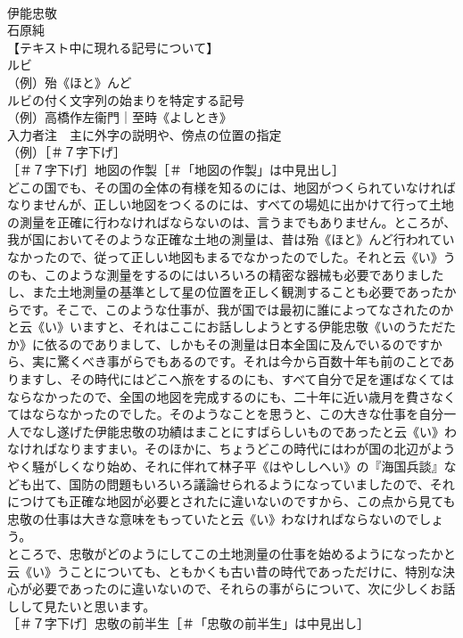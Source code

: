 \documentclass[8pt]{extreport}
\begin{document}
\begin{CJK}{UTF8}{min}
\\	伊能忠敬
\\	石原純
\\	【テキスト中に現れる記号について】
\\	ルビ
\\	（例）殆《ほと》んど
\\	ルビの付く文字列の始まりを特定する記号
\\	（例）高橋作左衞門｜至時《よしとき》
\\	入力者注　主に外字の説明や、傍点の位置の指定
\\	（例）［＃７字下げ］
\\	［＃７字下げ］地図の作製［＃「地図の作製」は中見出し］
\\	どこの国でも、その国の全体の有様を知るのには、地図がつくられていなければなりませんが、正しい地図をつくるのには、すべての場処に出かけて行って土地の測量を正確に行わなければならないのは、言うまでもありません。ところが、我が国においてそのような正確な土地の測量は、昔は殆《ほと》んど行われていなかったので、従って正しい地図もまるでなかったのでした。それと云《い》うのも、このような測量をするのにはいろいろの精密な器械も必要でありましたし、また土地測量の基準として星の位置を正しく観測することも必要であったからです。そこで、このような仕事が、我が国では最初に誰によってなされたのかと云《い》いますと、それはここにお話ししようとする伊能忠敬《いのうただたか》に依るのでありまして、しかもその測量は日本全国に及んでいるのですから、実に驚くべき事がらでもあるのです。それは今から百数十年も前のことでありますし、その時代にはどこへ旅をするのにも、すべて自分で足を運ばなくてはならなかったので、全国の地図を完成するのにも、二十年に近い歳月を費さなくてはならなかったのでした。そのようなことを思うと、この大きな仕事を自分一人でなし遂げた伊能忠敬の功績はまことにすばらしいものであったと云《い》わなければなりますまい。そのほかに、ちょうどこの時代にはわが国の北辺がようやく騒がしくなり始め、それに伴れて林子平《はやししへい》の『海国兵談』なども出て、国防の問題もいろいろ議論せられるようになっていましたので、それにつけても正確な地図が必要とされたに違いないのですから、この点から見ても忠敬の仕事は大きな意味をもっていたと云《い》わなければならないのでしょう。
\\	ところで、忠敬がどのようにしてこの土地測量の仕事を始めるようになったかと云《い》うことについても、ともかくも古い昔の時代であっただけに、特別な決心が必要であったのに違いないので、それらの事がらについて、次に少しくお話しして見たいと思います。
\\	［＃７字下げ］忠敬の前半生［＃「忠敬の前半生」は中見出し］

\end{CJK}
\end{document}
